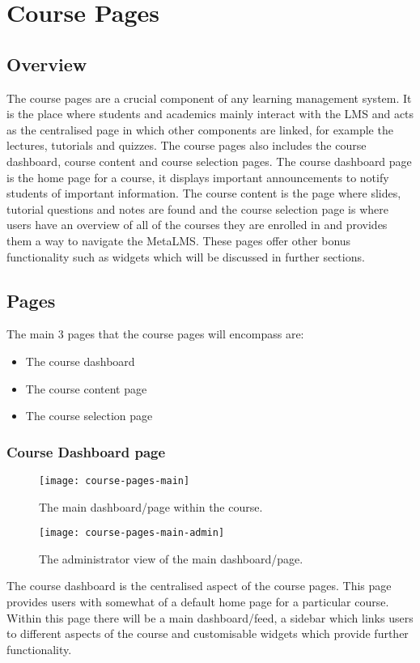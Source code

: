 \section{Course Pages}
\subsection{Overview}
The course pages are a crucial component of any learning management system.
It is the place where students and academics mainly interact with the LMS and acts as the centralised page in which other components are linked, for example the lectures, tutorials and quizzes. 
The course pages also includes the course dashboard, course content and course selection pages. 
The course dashboard page is the home page for a course, it displays important announcements to notify students of important information.
The course content is the page where slides, tutorial questions and notes are found and the course selection page is where users have an overview of all of the courses they are enrolled in and provides them a way to navigate the MetaLMS.
These pages offer other bonus functionality such as widgets which will be discussed in further sections.

\subsection{Pages}
The main 3 pages that the course pages will encompass are:
\begin{itemize}
    \item The course dashboard
    \item The course content page
    \item The course selection page
\end{itemize}

\subsubsection{Course Dashboard page}
\begin{figure}[h]
    \centering
    \texttt{[image: course-pages-main]}
    \caption{The main dashboard/page within the course.}
\end{figure}
\begin{figure}[h]
    \centering
    \texttt{[image: course-pages-main-admin]}
    \caption{The administrator view of the main dashboard/page.}
\end{figure}
The course dashboard is the centralised aspect of the course pages.
This page provides users with somewhat of a default home page for a particular course.
Within this page there will be a main dashboard/feed, a sidebar which links users to different aspects of the course and customisable widgets which provide further functionality. 

